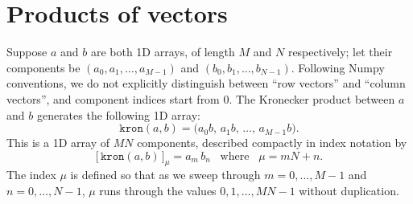 \documentclass[pra,12pt]{revtex4}
\begin{document}
\section{Products of vectors}

Suppose $a$ and $b$ are both 1D arrays, of length $M$ and $N$
respectively; let their components be $(a_0, a_1, \dots, a_{M-1})$ and
$(b_0, b_1, \dots, b_{N-1})$.  Following Numpy conventions, we do not
explicitly distinguish between ``row vectors'' and ``column vectors'',
and component indices start from 0.  The Kronecker product between $a$
and $b$ generates the following 1D array:
\begin{equation}
  \texttt{kron}(a, b) = \Big(a_0b,\, a_1 b,\, \dots,\, a_{M-1}b\Big).
\end{equation}
This is a 1D array of $MN$ components, described compactly in index
notation by
\begin{equation}
  \big[\, \texttt{kron}(a, b) \,\big]_{\mu} = a_m \, b_n \;\;\;\mathrm{where}\;\;\;\mu = mN+n.
  \label{kronab}
\end{equation}
The index $\mu$ is defined so that as we sweep through $m =
0,\dots,M-1$ and $n = 0,\dots,N-1$, $\mu$ runs through the values
$0,1,\dots,MN-1$ without duplication.
\end{document}
